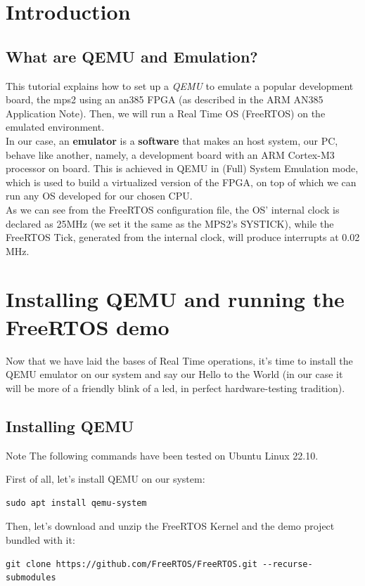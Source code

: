 \documentclass[10pt]{article}
\begin{document}
\section{Introduction}
\subsection{What are QEMU and Emulation?}
This tutorial explains how to set up a \textit{QEMU} to emulate a popular development board, the mps2 using an an385 FPGA (as described in the ARM AN385 Application Note). Then, we will run a Real Time OS (FreeRTOS) on the emulated environment.
\\
\vspace*{0.2cm}
In our case, an \textbf{emulator} is a \textbf{software} that makes an host system, our PC, behave like another, namely, a development board with an ARM Cortex-M3 processor on board. This is achieved in QEMU in (Full) System Emulation mode, which is used to build a virtualized version of the FPGA, on top of which we can run any OS developed for our chosen CPU.
\\
\vspace*{0.2cm}
As we can see from the FreeRTOS configuration file, the OS’ internal clock is declared as 25MHz (we set it the same as the MPS2’s SYSTICK), while the FreeRTOS Tick, generated from the internal clock, will produce interrupts at 0.02 MHz.

\section{Installing QEMU and running the FreeRTOS demo}
Now that we have laid the bases of Real Time operations, it’s time to install the QEMU emulator on our system and say our Hello to the World (in our case it will be more of a friendly blink of a led, in perfect hardware-testing tradition).
\subsection{Installing QEMU}
\begin{example}{Note}
The following commands have been tested on Ubuntu Linux 22.10.
\end{example}

First of all, let's install QEMU on our system:
\begin{lstlisting}
sudo apt install qemu-system
\end{lstlisting}
Then, let's download and unzip the FreeRTOS Kernel and the demo project bundled with it:
\begin{lstlisting}
git clone https://github.com/FreeRTOS/FreeRTOS.git --recurse-submodules
\end{lstlisting}
\end{document}
